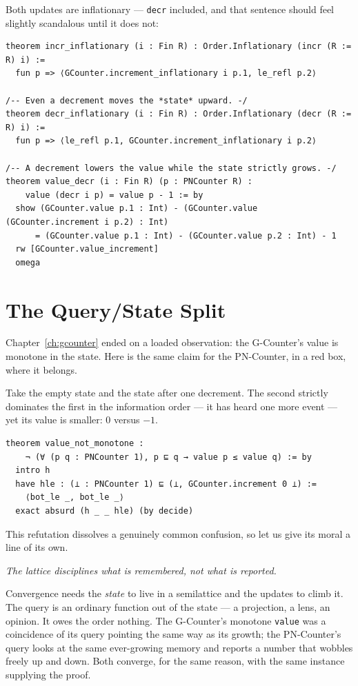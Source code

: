 \documentclass[12pt, a4paper, openright]{book}
\theoremstyle{thmstyle}
\theoremstyle{defstyle}
\newcommand{\lc}[1]{\texttt{#1}}
\newcounter{refutation}[chapter]
\renewcommand{\therefutation}{\thechapter.\arabic{refutation}}
\newenvironment{refutedbox}[1]{%
  \refstepcounter{refutation}%
  \begin{tcolorbox}[refutedbox,
    title={Refuted \therefutation\ --- #1}]%
}{\end{tcolorbox}}
\begin{document}
Both updates are inflationary --- \lc{decr} included, and that sentence
should feel slightly scandalous until it does not:

\begin{verbatim}
theorem incr_inflationary (i : Fin R) : Order.Inflationary (incr (R := R) i) :=
  fun p => ⟨GCounter.increment_inflationary i p.1, le_refl p.2⟩

/-- Even a decrement moves the *state* upward. -/
theorem decr_inflationary (i : Fin R) : Order.Inflationary (decr (R := R) i) :=
  fun p => ⟨le_refl p.1, GCounter.increment_inflationary i p.2⟩

/-- A decrement lowers the value while the state strictly grows. -/
theorem value_decr (i : Fin R) (p : PNCounter R) :
    value (decr i p) = value p - 1 := by
  show (GCounter.value p.1 : Int) - (GCounter.value (GCounter.increment i p.2) : Int)
      = (GCounter.value p.1 : Int) - (GCounter.value p.2 : Int) - 1
  rw [GCounter.value_increment]
  omega
\end{verbatim}

\section{The Query/State Split}

Chapter~\ref{ch:gcounter} ended on a loaded observation: the G-Counter's
value is monotone in the state. Here is the same claim for the
PN-Counter, in a red box, where it belongs.

\begin{refutedbox}{The CRDT's value is monotone}
  \label{ref:value-monotone}
  Take the empty state and the state after one decrement. The second
  strictly dominates the first in the information order --- it has heard
  one more event --- yet its value is smaller: $0$ versus $-1$.
\begin{verbatim}
theorem value_not_monotone :
    ¬ (∀ (p q : PNCounter 1), p ⊑ q → value p ≤ value q) := by
  intro h
  have hle : (⊥ : PNCounter 1) ⊑ (⊥, GCounter.increment 0 ⊥) :=
    ⟨bot_le _, bot_le _⟩
  exact absurd (h _ _ hle) (by decide)
\end{verbatim}
\end{refutedbox}

This refutation dissolves a genuinely common confusion, so let us give
its moral a line of its own.

\emph{The lattice disciplines what is remembered, not what is reported.}

Convergence needs the \emph{state} to live in a semilattice and the
updates to climb it. The query is an ordinary function out of the state
--- a projection, a lens, an opinion. It owes the order nothing. The
G-Counter's monotone \lc{value} was a coincidence of its query pointing
the same way as its growth; the PN-Counter's query looks at the same
ever-growing memory and reports a number that wobbles freely up and
down. Both converge, for the same reason, with the same instance
supplying the proof.
\end{document}
